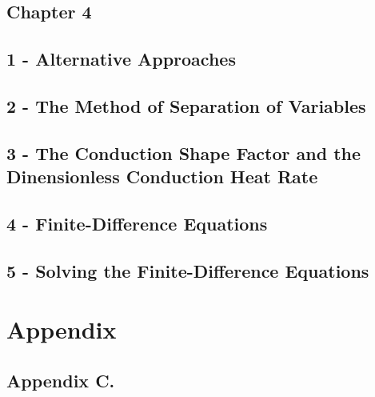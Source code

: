 \documentclass[10pt,landscape]{article}
\newenvironment{Figure}
     {\par\medskip\noindent\minipage{\linewidth}}
     {\endminipage\par\medskip}
\begin{document}
\begin{multicols}{3}
\subsection{Chapter 4}
\subsection{1 - Alternative Approaches}
\subsection{2 - The Method of Separation of Variables}
\subsection{3 - The Conduction Shape Factor and the Dinensionless Conduction Heat Rate}
\subsection{4 - Finite-Difference Equations}
\subsection{5 - Solving the Finite-Difference Equations}


\section{Appendix}
\subsection{Appendix C.}


%
%

\end{multicols}
\end{document}
